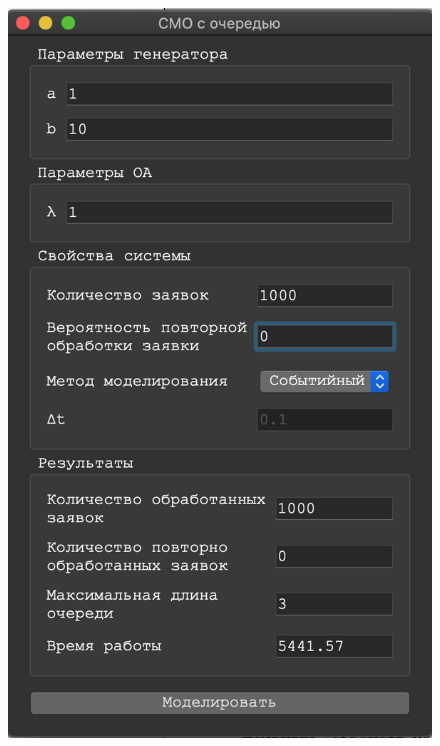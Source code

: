 \documentclass[a4paper,12pt]{article}
\begin{document}
	\begin{figure}[h!]
		\begin{minipage}[b]{0.32\textwidth}
			\includegraphics[width=\textwidth]{sob_1_1.png}
		\end{minipage}
		\begin{minipage}[b]{0.32\textwidth}

\end{minipage}
\end{figure}
\end{document}

